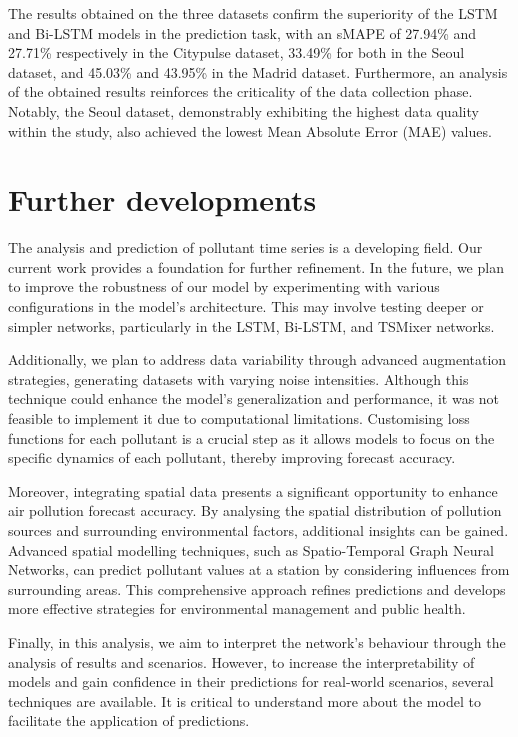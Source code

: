 The results obtained on the three datasets confirm the superiority of the LSTM and Bi-LSTM models in the prediction task, with an sMAPE of 27.94\% and 27.71\% respectively in the Citypulse dataset, 33.49\% for both in the Seoul dataset, and 45.03\% and 43.95\% in the Madrid dataset. Furthermore, an analysis of the obtained results reinforces the criticality of the data collection phase. Notably, the Seoul dataset, demonstrably exhibiting the highest data quality within the study, also achieved the lowest Mean Absolute Error (MAE) values.

\section*{Further developments}

The analysis and prediction of pollutant time series is a developing field. Our current work provides a foundation for further refinement. In the future, we plan to improve the robustness of our model by experimenting with various configurations in the model's architecture. This may involve testing deeper or simpler networks, particularly in the LSTM, Bi-LSTM, and TSMixer networks.

Additionally, we plan to address data variability through advanced augmentation strategies, generating datasets with varying noise intensities. Although this technique could enhance the model's generalization and performance, it was not feasible to implement it due to computational limitations.
Customising loss functions for each pollutant is a crucial step as it allows models to focus on the specific dynamics of each pollutant, thereby improving forecast accuracy.

Moreover, integrating spatial data presents a significant opportunity to enhance air pollution forecast accuracy. By analysing the spatial distribution of pollution sources and surrounding environmental factors, additional insights can be gained. Advanced spatial modelling techniques, such as Spatio-Temporal Graph Neural Networks, can predict pollutant values at a station by considering influences from surrounding areas. This comprehensive approach refines predictions and develops more effective strategies for environmental management and public health.

Finally, in this analysis, we aim to interpret the network's behaviour through the analysis of results and scenarios. However, to increase the interpretability of models and gain confidence in their predictions for real-world scenarios, several techniques are available. It is critical to understand more about the model to facilitate the application of predictions.